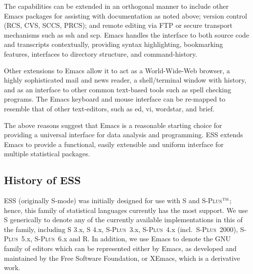 \documentclass{article}
\newcommand*{\Splus}{\textsc{S-Plus}}
\newcommand*{\XLispStat}{\textsc{XLispStat}}
\newcommand{\stexttt}[1]{{\small\texttt{#1}}}
\newcommand{\tm}{$^{\mbox{\scriptsize\sc tm}}$}
\newcommand{\file}[1]{`\stexttt{#1}'}
\begin{document}
The capabilities can be extended in an orthogonal manner to include
other Emacs packages for assisting with documentation as noted above;
version control (RCS, CVS, SCCS, PRCS); and remote editing via FTP or
secure transport mechanisms such as ssh and scp.  Emacs handles the
interface to both source code and transcripts contextually, providing
syntax highlighting, bookmarking features, interfaces to directory
structure, and command-history.


Other extensions to Emacs allow it to act as a World-Wide-Web browser,
a highly sophisticated mail and news reader, a shell/terminal window
with history, and as an interface to other common text-based tools
such as spell checking programs.  The Emacs keyboard and mouse
interface can be re-mapped to resemble that of other text-editors,
such as ed, vi, wordstar, and brief.

The above reasons suggest that Emacs is a reasonable starting choice
for providing a universal interface for data analysis and programming.
ESS extends Emacs to provide a functional, easily extensible and
uniform interface for multiple statistical packages.

\subsection{History of ESS}
\label{sec:ESS:history}

ESS (originally S-mode) was initially designed for use with S and
\Splus\tm; hence, this family of statistical languages currently has
the most support.  We use S generically to denote any of the currently
available implementations in this of the family, including S 3.x, S
4.x, \Splus~3.x, \Splus~4.x (incl.\ \Splus~2000), \Splus~5.x,
\Splus~6.x and R.  In addition, we use Emacs to denote the GNU family
of editors which can be represented either by Emacs, as developed and
maintained by the Free Software Foundation, or XEmacs, which is a
derivative work.
\end{document}
